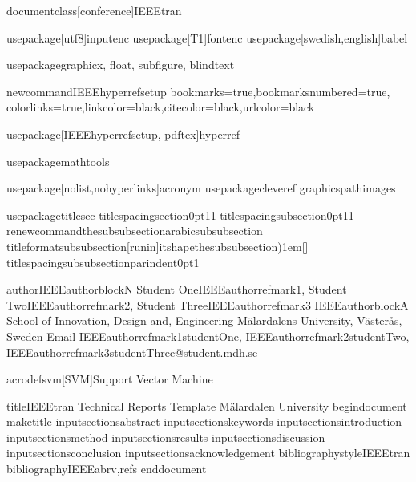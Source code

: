 documentclass[conference]{IEEEtran}

usepackage[utf8]{inputenc}
usepackage[T1]{fontenc}
usepackage[swedish,english]{babel}

usepackage{graphicx, float, subfigure, blindtext}

newcommandIEEEhyperrefsetup{
bookmarks=true,bookmarksnumbered=true,%
colorlinks=true,linkcolor={black},citecolor={black},urlcolor={black}%
}

usepackage[IEEEhyperrefsetup, pdftex]{hyperref}

usepackage{mathtools}

usepackage[nolist,nohyperlinks]{acronym}
usepackage{cleveref}
graphicspath{{images}}

usepackage{titlesec}
titlespacing{section}{0pt}{1}{1}
titlespacing{subsection}{0pt}{1}{1}
renewcommand{thesubsubsection}{arabic{subsubsection}}
titleformat{subsubsection}[runin]{itshape}{thesubsubsection)}{1em}{}[]
titlespacing{subsubsection}{parindent}{0pt}{1}

author{IEEEauthorblockN{ %
Student OneIEEEauthorrefmark{1},
Student TwoIEEEauthorrefmark{2}, 
Student ThreeIEEEauthorrefmark{3}
}
IEEEauthorblockA{
School of Innovation, Design and, Engineering
Mälardalens University, Västerås, Sweden
Email
IEEEauthorrefmark{1}studentOne, 
IEEEauthorrefmark{2}studentTwo,
IEEEauthorrefmark{3}studentThree@student.mdh.se
}}

acrodef{svm}[SVM]{Support Vector Machine}

title{IEEEtran Technical Reports Template
Mälardalen University}
begin{document}
maketitle
input{sectionsabstract}
input{sectionskeywords}
input{sectionsintroduction}
input{sectionsmethod}
input{sectionsresults}
input{sectionsdiscussion}
input{sectionsconclusion}
input{sectionsacknowledgement}
bibliographystyle{IEEEtran}
bibliography{IEEEabrv,refs}
end{document}